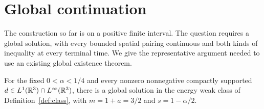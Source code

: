 \section{Global continuation}\label{sec:continuation}

The construction so far is on a positive finite interval. The question
requires a global solution, with every bounded spatial pairing continuous
and both kinds of inequality at every terminal time. We give the
representative argument needed to use an existing global existence theorem.

\begin{proposition}\label{prop:global-source}
For the fixed $0<\alpha<1/4$ and every nonzero nonnegative compactly
supported $d\in L^1(\mathbb R^3)\cap L^\infty(\mathbb R^3)$, there is a global
solution in the energy weak class of Definition~\ref{def:class}, with
$m=1+a=3/2$ and $s=1-\alpha/2$.
\end{proposition}

